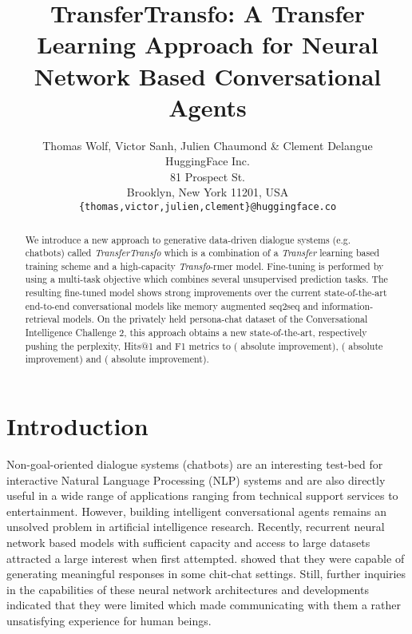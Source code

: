 \documentclass[letterpaper]{article} \usepackage{aaai19}  \usepackage{times}  \usepackage{helvet}  \usepackage{courier}  \usepackage{url}  \usepackage{graphicx}  \usepackage{natbib}
\begin{document}
\title{TransferTransfo: A Transfer Learning Approach for Neural Network Based Conversational Agents}
\author{Thomas Wolf, Victor Sanh, Julien Chaumond \& Clement Delangue \\
HuggingFace  Inc.\\
81 Prospect St.\\
Brooklyn, New York 11201, USA\\
{\tt \{thomas,victor,julien,clement\}@huggingface.co} \\}

\maketitle
\begin{abstract}
  We introduce a new approach to generative data-driven dialogue systems (e.g. chatbots) called \textit{TransferTransfo} which is a combination of a \textit{Transfer} learning based training scheme and a high-capacity \textit{Transfo}-rmer model. Fine-tuning is performed by using a multi-task objective which combines several unsupervised prediction tasks. The resulting fine-tuned model shows strong improvements over the current state-of-the-art end-to-end conversational models like memory augmented seq2seq and information-retrieval models. On the privately held {\sc persona-chat} dataset of the Conversational Intelligence Challenge 2, this approach obtains a new state-of-the-art, respectively pushing the perplexity, Hits@1 and F1 metrics to  ( absolute improvement),  ( absolute improvement) and  ( absolute improvement).
\end{abstract}

\section{Introduction}

Non-goal-oriented dialogue systems (chatbots) are an interesting test-bed for interactive Natural Language Processing (NLP) systems and are also directly useful in a wide range of applications ranging from technical support services to entertainment. However, building intelligent conversational agents remains an unsolved problem in artificial intelligence research. Recently, recurrent neural network based models with sufficient capacity and access to large datasets attracted a large interest when first attempted. \citet{vinyals_neural_2015} showed that they were capable of generating meaningful responses in some chit-chat settings. Still, further inquiries in the capabilities of these neural network architectures and developments \citep{serban_hierarchical_2016,miao_neural_2015,sordoni_hierarchical_2015,serban_deep_2017,li_simple_2016,li_adversarial_2017} indicated that they were limited which made communicating with them a rather unsatisfying experience for human beings.
\end{document}
